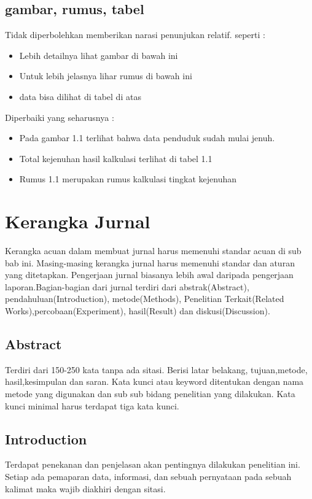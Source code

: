 \subsection{gambar, rumus, tabel}
Tidak diperbolehkan memberikan narasi penunjukan relatif. seperti :
\begin{itemize}
	\item Lebih detailnya lihat gambar di bawah ini
	\item Untuk lebih jelasnya lihar rumus di bawah ini
	\item data bisa dilihat di tabel di atas
\end{itemize}
Diperbaiki yang seharusnya :
\begin{itemize}
	\item Pada gambar 1.1 terlihat bahwa data penduduk sudah mulai jenuh.
	\item Total kejenuhan hasil kalkulasi terlihat di tabel 1.1
	\item Rumus 1.1 merupakan rumus kalkulasi tingkat kejenuhan
\end{itemize}

\section{Kerangka Jurnal}
Kerangka acuan dalam membuat jurnal harus memenuhi standar acuan di sub bab ini. Masing-masing kerangka jurnal harus memenuhi standar dan aturan yang ditetapkan. Pengerjaan jurnal biasanya lebih awal daripada pengerjaan laporan.Bagian-bagian dari jurnal terdiri dari abstrak(Abstract), pendahuluan(Introduction), metode(Methods), Penelitian Terkait(Related Works),percobaan(Experiment), hasil(Result) dan diskusi(Discussion).
\subsection{Abstract}
Terdiri dari 150-250 kata tanpa ada sitasi. Berisi latar belakang, tujuan,metode, hasil,kesimpulan dan saran. Kata kunci atau keyword ditentukan dengan nama metode yang digunakan dan sub sub bidang penelitian yang dilakukan. Kata kunci minimal harus terdapat tiga kata kunci.

\subsection{Introduction}
Terdapat penekanan dan penjelasan akan pentingnya dilakukan penelitian ini. Setiap ada pemaparan data, informasi, dan sebuah pernyataan pada sebuah kalimat maka wajib diakhiri dengan sitasi.

